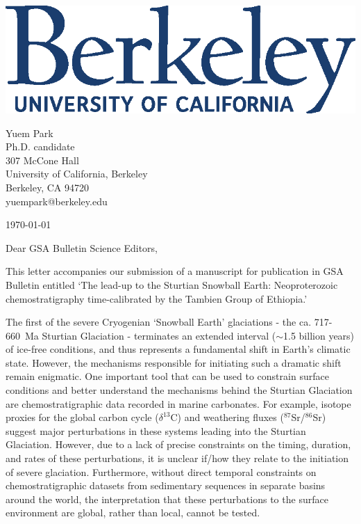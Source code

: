 \documentclass[11pt]{letter}
\newcommand{\dC}{$\delta^{13}$C\xspace}
\newcommand{\SrSr}{$^{87}$Sr/$^{86}$Sr\xspace}
\begin{document}
\begin{minipage}{0.35\textwidth}
\includegraphics[width=\linewidth]{Figures/UCBerkeley_wordmark_blue.eps}
\end{minipage}
\hfill
\begin{minipage}{0.6\textwidth}\raggedleft
Yuem Park\\
Ph.D. candidate\\
307 McCone Hall\\
University of California, Berkeley\\
Berkeley, CA 94720\\
yuempark@berkeley.edu
\end{minipage}

\vspace{0.5cm}
\hrulefill
\vspace{-0.1cm}

\null\hfill \today

Dear GSA Bulletin Science Editors,

This letter accompanies our submission of a manuscript for publication in GSA Bulletin entitled `The lead-up to the Sturtian Snowball Earth: Neoproterozoic chemostratigraphy time-calibrated by the Tambien Group of Ethiopia.'

The first of the severe Cryogenian `Snowball Earth' glaciations - the ca. 717-660~Ma Sturtian Glaciation - terminates an extended interval ($\sim$1.5 billion years) of ice-free conditions, and thus represents a fundamental shift in Earth's climatic state. However, the mechanisms responsible for initiating such a dramatic shift remain enigmatic. One important tool that can be used to constrain surface conditions and better understand the mechanisms behind the Sturtian Glaciation are chemostratigraphic data recorded in marine carbonates. For example, isotope proxies for the global carbon cycle (\dC) and weathering fluxes (\SrSr) suggest major perturbations in these systems leading into the Sturtian Glaciation. However, due to a lack of precise constraints on the timing, duration, and rates of these perturbations, it is unclear if/how they relate to the initiation of severe glaciation. Furthermore, without direct temporal constraints on chemostratigraphic datasets from sedimentary sequences in separate basins around the world, the interpretation that these perturbations to the surface environment are global, rather than local, cannot be tested.
\end{document}
